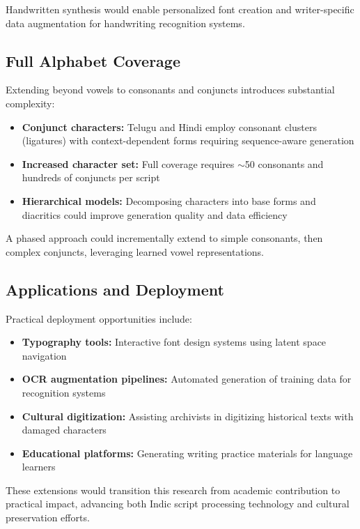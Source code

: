 \documentclass[review]{elsarticle}
\begin{document}
Handwritten synthesis would enable personalized font creation and writer-specific data augmentation for handwriting recognition systems.

\subsection{Full Alphabet Coverage}

Extending beyond vowels to consonants and conjuncts introduces substantial complexity:

\begin{itemize}
\item \textbf{Conjunct characters:} Telugu and Hindi employ consonant clusters (ligatures) with context-dependent forms requiring sequence-aware generation
\item \textbf{Increased character set:} Full coverage requires $\sim$50 consonants and hundreds of conjuncts per script
\item \textbf{Hierarchical models:} Decomposing characters into base forms and diacritics could improve generation quality and data efficiency
\end{itemize}

A phased approach could incrementally extend to simple consonants, then complex conjuncts, leveraging learned vowel representations.

\subsection{Applications and Deployment}

Practical deployment opportunities include:

\begin{itemize}
\item \textbf{Typography tools:} Interactive font design systems using latent space navigation
\item \textbf{OCR augmentation pipelines:} Automated generation of training data for recognition systems
\item \textbf{Cultural digitization:} Assisting archivists in digitizing historical texts with damaged characters
\item \textbf{Educational platforms:} Generating writing practice materials for language learners
\end{itemize}

These extensions would transition this research from academic contribution to practical impact, advancing both Indic script processing technology and cultural preservation efforts.
\end{document}
